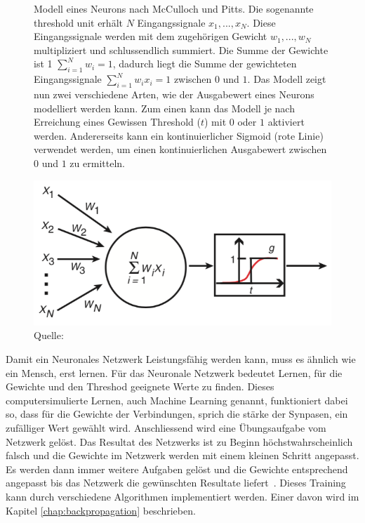 \begin{figure}[h]
    \captionsetup{width=.9\linewidth}
    \caption[Modell eines Neurons nach McCulloch und Pitts]{Modell eines Neurons nach McCulloch und Pitts. Die sogenannte threshold unit erhält $N$ Eingangssignale $x_1, ..., x_N$. Diese Eingangssignale werden mit dem zugehörigen Gewicht $w_1, ..., w_N$ multipliziert und schlussendlich summiert. Die Summe der Gewichte ist 1 $\sum_{i=1}^{N} w_i = 1$, dadurch liegt die Summe der gewichteten Eingangssignale $\sum_{i=1}^{N} w_i x_i = 1$ zwischen $0$ und $1$. Das Modell zeigt nun zwei verschiedene Arten, wie der Ausgabewert eines Neurons modelliert werden kann. Zum einen kann das Modell je nach Erreichung eines Gewissen Threshold ($t$) mit $0$ oder $1$ aktiviert werden. Andererseits kann ein kontinuierlicher Sigmoid (rote Linie) verwendet werden, um einen kontinuierlichen Ausgabewert zwischen $0$ und $1$ zu ermitteln.}
    \label{krogh:a}
    \centering
    \includegraphics[width=0.5\linewidth]{graphics/krogh/krogh_neural-network.png}
    \caption*{Quelle: \textcite{Krogh2008}}
\end{figure}

Damit ein Neuronales Netzwerk Leistungsfähig werden kann, muss es ähnlich wie ein Mensch, erst lernen. Für das Neuronale Netzwerk bedeutet Lernen, für die Gewichte und den Threshod geeignete Werte zu finden. Dieses computersimulierte Lernen, auch Machine Learning genannt, funktioniert dabei so, dass für die Gewichte der Verbindungen, sprich die stärke der Synpasen, ein zufälliger Wert gewählt wird. Anschliessend wird eine Übungsaufgabe vom Netzwerk gelöst. Das Resultat des Netzwerks ist zu Beginn höchstwahrscheinlich falsch und die Gewichte im Netzwerk werden mit einem kleinen Schritt angepasst. Es werden dann immer weitere Aufgaben gelöst und die Gewichte entsprechend angepasst bis das Netzwerk die gewünschten Resultate liefert~\autocite{Krogh2008}.
Dieses Training kann durch verschiedene Algorithmen implementiert werden. Einer davon wird im Kapitel \ref{chap:backpropagation} beschrieben.


